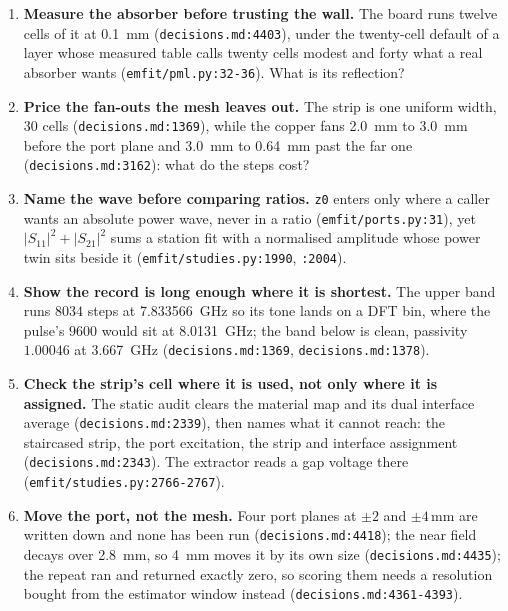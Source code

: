 \begin{enumerate}[leftmargin=1.6em,itemsep=3pt]
  \item \textbf{Measure the absorber before trusting the wall.} The board runs twelve cells of it at \SI{0.1}{mm}
        (\texttt{decisions.md:4403}), under the twenty-cell default of a layer whose measured table calls twenty
        cells modest and forty what a real absorber wants (\texttt{emfit/pml.py:32-36}). What is its reflection?
  \item \textbf{Price the fan-outs the mesh leaves out.} The strip is one uniform width, $30$ cells
        (\texttt{decisions.md:1369}), while the copper fans \SI{2.0}{mm} to \SI{3.0}{mm} before the port plane and
        \SI{3.0}{mm} to \SI{0.64}{mm} past the far one (\texttt{decisions.md:3162}): what do the steps cost?
  \item \textbf{Name the wave before comparing ratios.} \texttt{z0} enters only where a caller wants an absolute
        power wave, never in a ratio (\texttt{emfit/ports.py:31}), yet $|S_{11}|^2+|S_{21}|^2$ sums a station fit
        with a normalised amplitude whose power twin sits beside it (\texttt{emfit/studies.py:1990}, \texttt{:2004}).
  \item \textbf{Show the record is long enough where it is shortest.} The upper band runs $8034$ steps at
        \SI{7.833566}{\giga\hertz} so its tone lands on a DFT bin, where the pulse's $9600$ would sit at
        \SI{8.0131}{\giga\hertz}; the band below is clean, passivity $1.00046$ at \SI{3.667}{\giga\hertz}
        (\texttt{decisions.md:1369}, \texttt{decisions.md:1378}).
  \item \textbf{Check the strip's cell where it is used, not only where it is assigned.} The static audit clears
        the material map and its dual interface average (\texttt{decisions.md:2339}), then names what it cannot
        reach: the staircased strip, the port excitation, the strip and interface assignment
        (\texttt{decisions.md:2343}). The extractor reads a gap voltage there (\texttt{emfit/studies.py:2766-2767}).
  \item \textbf{Move the port, not the mesh.} Four port planes at $\pm 2$ and $\pm 4$\,mm are written down and
        none has been run (\texttt{decisions.md:4418}); the near field decays over \SI{2.8}{mm}, so \SI{4}{mm} moves
        it by its own size (\texttt{decisions.md:4435}); the repeat ran and returned exactly zero, so scoring
        them needs a resolution bought from the estimator window instead
        (\texttt{decisions.md:4361-4393}).
\end{enumerate}

